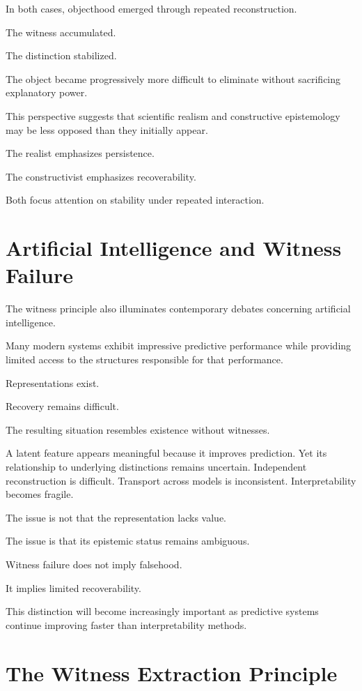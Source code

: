 \documentclass[11pt,oneside,openany]{book}
\begin{document}
In both cases, objecthood emerged through repeated reconstruction.

The witness accumulated.

The distinction stabilized.

The object became progressively more difficult to eliminate without sacrificing explanatory power.

This perspective suggests that scientific realism and constructive epistemology may be less opposed than they initially appear.

The realist emphasizes persistence.

The constructivist emphasizes recoverability.

Both focus attention on stability under repeated interaction.

\section{Artificial Intelligence and Witness Failure}

The witness principle also illuminates contemporary debates concerning artificial intelligence.

Many modern systems exhibit impressive predictive performance while providing limited access to the structures responsible for that performance.

Representations exist.

Recovery remains difficult.

The resulting situation resembles existence without witnesses.

A latent feature appears meaningful because it improves prediction. Yet its relationship to underlying distinctions remains uncertain. Independent reconstruction is difficult. Transport across models is inconsistent. Interpretability becomes fragile.

The issue is not that the representation lacks value.

The issue is that its epistemic status remains ambiguous.

Witness failure does not imply falsehood.

It implies limited recoverability.

This distinction will become increasingly important as predictive systems continue improving faster than interpretability methods.

\section{The Witness Extraction Principle}
\end{document}

